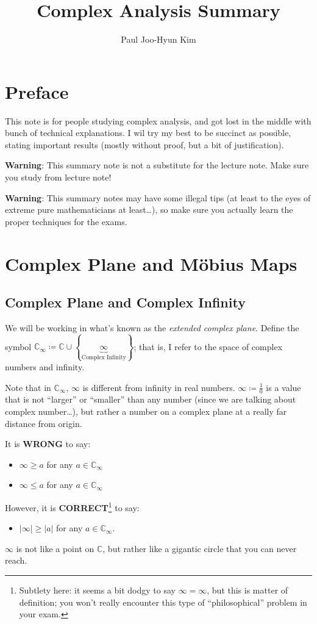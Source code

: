 \documentclass[a4paper, 12pt]{article}
\title{Complex Analysis Summary}
\author{Paul Joo-Hyun Kim}
\theoremstyle{definition}
\numberwithin{theorem}{section}
\numberwithin{definition}{section}
\numberwithin{exercise}{section}
\numberwithin{remark}{section}
\numberwithin{figure}{section}
\numberwithin{example}{section}
\newcommand{\C}{\mathbb{C}}
\begin{document}
\maketitle
\tableofcontents
\setcounter{section}{-1}
\section{Preface}
This note is for people studying complex analysis,
and got lost in the middle with bunch of technical explanations.
I wil try my best to be succinct as possible,
stating important results (mostly without proof, but a bit of justification).

\textbf{Warning}: This summary note is not a substitute for the lecture note.
Make sure you study from lecture note!

\textbf{Warning}: This summary notes may have some illegal tips (at least to the eyes of extreme pure mathematicians at least\dots),
so make sure you actually learn the proper techniques for the exams.

\section{Complex Plane and M\"obius Maps}
\subsection{Complex Plane and Complex Infinity}
We will be working in what's known as the \textit{extended complex plane}.
Define the symbol $\C_{\infty} \coloneqq \C \cup \left\{ \underbrace{\infty}_{\text{Complex Infinity}} \right\}$;
that is, I refer to the space of complex numbers
and infinity.

Note that in $\C_{\infty}$, $\infty$ is different from infinity in real numbers.
$\infty \coloneqq \frac{1}{0}$ is a value that is not ``larger'' or ``smaller'' than any number
(since we are talking about complex number\dots), but rather
a number on a complex plane at a really far distance from origin.

It is \textbf{WRONG} to say:
\begin{itemize}
    \item $\infty \geq a$ for any $a \in \C_{\infty}$
    \item $\infty \leq a$ for any $a \in \C_{\infty}$
\end{itemize}
However, it is \textbf{CORRECT}\footnote{
    Subtlety here: it seems a bit dodgy to say $\infty = \infty$,
    but this is matter of definition;
    you won't really encounter this type of ``philosophical'' problem
    in your exam.
} to say:
\begin{itemize}
    \item $|\infty| \geq |a|$ for any $a \in \C_{\infty}$.
\end{itemize}
$\infty$ is not like a point on $\C$, but rather like a gigantic circle that you can never reach.
\end{document}
